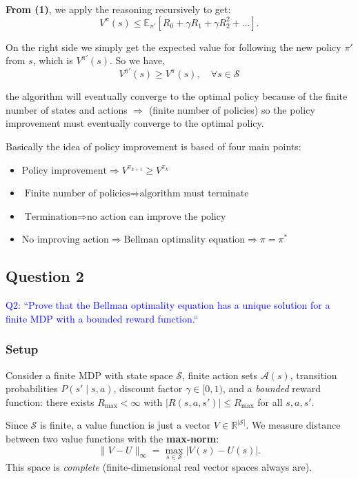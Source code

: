 \documentclass{scrartcl}
\theoremstyle{mytheoremstyle}
\theoremstyle{mytheoremstyle}
\theoremstyle{myproblemstyle}
\begin{document}
\textbf{From (1)}, we apply the reasoning recursively to get:
\[
    V^{\pi}(s) \leq \mathbb{E}_{\pi'} \left[ R_0 + \gamma R_1 + \gamma R_2^2 + \dots\right].
\]

On the right side we simply get the expected value for following the new policy $\pi'$ from $s$, which is $V^{\pi'}(s)$. So we have,\textbf{}
\[
    V^{\pi'}(s) \geq V^{\pi}(s), \quad \forall s \in \mathcal{S}
\]

the algorithm will eventually converge to the optimal policy because of the finite number of states and actions $\Rightarrow$ (finite number of policies) so the policy improvement must eventually converge to the optimal policy.


Basically the idea of policy improvement is based of four main points:

\begin{itemize}
    \item $\boxed{\text{Policy improvement} \Rightarrow V^{\pi_{k+1}} \ge V^{\pi_k}} $
    \item $\boxed{\text{Finite number of policies} \Rightarrow \text{algorithm must terminate} } $
    \item $\boxed{\text{Termination} \Rightarrow \text{no action can improve the policy} } $
    \item $\boxed{\text{No improving action} \Rightarrow \text{Bellman optimality equation} \Rightarrow \pi = \pi^* } $
\end{itemize}

\subsection{Question 2}

\textcolor{blue}{Q2: ``Prove that the Bellman optimality equation has a unique solution for a finite MDP with a bounded reward function.``}

\subsubsection*{Setup}

Consider a finite MDP with state space $\mathcal{S}$, finite action sets $\mathcal{A}(s)$, transition
probabilities $P(s'\mid s,a)$, discount factor $\gamma \in [0,1)$, and a \emph{bounded} reward function:
there exists $R_{\max}<\infty$ with $|R(s,a,s')|\le R_{\max}$ for all $s,a,s'$.

Since $\mathcal{S}$ is finite, a value function is just a vector $V \in \mathbb{R}^{|\mathcal{S}|}$. We
measure distance between two value functions with the \textbf{max-norm}:
\[
    \|V - U\|_\infty = \max_{s \in \mathcal{S}} |V(s) - U(s)|.
\]
This space is \emph{complete} (finite-dimensional real vector spaces always are).
\end{document}
